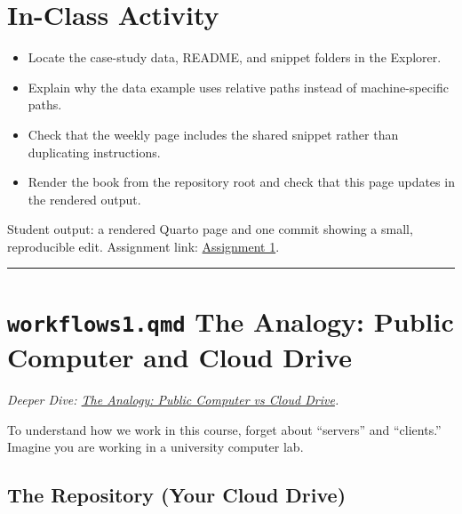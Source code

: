 \documentclass[
  letterpaper,
  DIV=11,
  numbers=noendperiod,
  oneside]{scrreprt}
\providecommand{\tightlist}{%
  \setlength{\itemsep}{0pt}\setlength{\parskip}{0pt}}
\begin{document}
\section*{In-Class Activity}\label{in-class-activity-1}


\begin{itemize}
\tightlist
\item
  Locate the case-study data, README, and snippet folders in the
  Explorer.
\item
  Explain why the data example uses relative paths instead of
  machine-specific paths.
\item
  Check that the weekly page includes the shared snippet rather than
  duplicating instructions.
\item
  Render the book from the repository root and check that this page
  updates in the rendered output.
\end{itemize}

Student output: a rendered Quarto page and one commit showing a small,
reproducible edit. Assignment link:
\href{../../assignments/assignment01-workflows/README.md}{Assignment 1}.

\begin{center}\rule{0.5\linewidth}{0.5pt}\end{center}

\section*{\texorpdfstring{\texttt{workflows1.qmd} The Analogy: Public
Computer and Cloud
Drive}{workflows1.qmd The Analogy: Public Computer and Cloud Drive}}\label{workflows1.qmd-the-analogy-public-computer-and-cloud-drive}


\emph{Deeper Dive: \href{workflows01-cloud-drive.qmd}{The Analogy:
Public Computer vs Cloud Drive}.}

To understand how we work in this course, forget about ``servers'' and
``clients.'' Imagine you are working in a university computer lab.

\subsection*{The Repository (Your Cloud
Drive)}\label{the-repository-your-cloud-drive}
\end{document}
